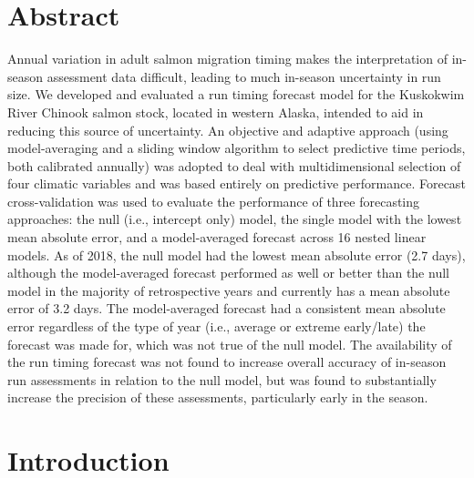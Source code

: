 \documentclass[12pt,]{book}
\theoremstyle{definition}
\theoremstyle{definition}
\theoremstyle{definition}
\theoremstyle{remark}
\begin{document}
\section*{Abstract}\label{abstract}

Annual variation in adult salmon migration timing makes the
interpretation of in-season assessment data difficult, leading to much
in-season uncertainty in run size. We developed and evaluated a run
timing forecast model for the Kuskokwim River Chinook salmon stock,
located in western Alaska, intended to aid in reducing this source of
uncertainty. An objective and adaptive approach (using model-averaging
and a sliding window algorithm to select predictive time periods, both
calibrated annually) was adopted to deal with multidimensional selection
of four climatic variables and was based entirely on predictive
performance. Forecast cross-validation was used to evaluate the
performance of three forecasting approaches: the null (i.e., intercept
only) model, the single model with the lowest mean absolute error, and a
model-averaged forecast across 16 nested linear models. As of 2018, the
null model had the lowest mean absolute error (2.7 days), although the
model-averaged forecast performed as well or better than the null model
in the majority of retrospective years and currently has a mean absolute
error of 3.2 days. The model-averaged forecast had a consistent mean
absolute error regardless of the type of year (i.e., average or extreme
early/late) the forecast was made for, which was not true of the null
model. The availability of the run timing forecast was not found to
increase overall accuracy of in-season run assessments in relation to
the null model, but was found to substantially increase the precision of
these assessments, particularly early in the season.

\section{Introduction}\label{introduction}
\end{document}
